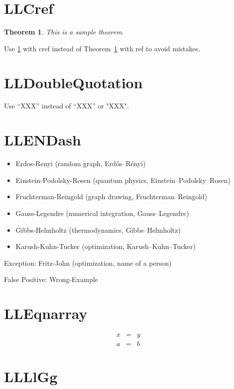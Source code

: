 \documentclass[a4paper, 10pt]{article}
\newtheorem{theorem}{Theorem}
\begin{document}
\section{LLCref}

\begin{theorem}
    \label{thm:sample}
    This is a sample theorem.
\end{theorem}

Use \cref{thm:sample} with cref instead of Theorem~\ref{thm:sample} with ref to avoid mistakes.

\section{LLDoubleQuotation}

Use ``XXX'' instead of “XXX” or "XXX".

\section{LLENDash}

\begin{itemize}
    \item Erdos-Renyi (random graph, Erd\H{o}s--R\'enyi)
    \item Einstein-Podolsky-Rosen (quantum physics, Einstein--Podolsky--Rosen)
    \item Fruchterman-Reingold (graph drawing, Fruchterman--Reingold)
    \item Gauss-Legendre (numerical integration, Gauss--Legendre)
    \item Gibbs-Helmholtz (thermodynamics, Gibbs--Helmholtz)
    \item Karush-Kuhn-Tucker (optimization, Karush--Kuhn--Tucker)
\end{itemize}

Exception: Fritz-John (optimization, name of a person)

False Positive: Wrong-Example

\section{LLEqnarray}

\begin{eqnarray}
    x & = & y \\
    a & = & b
\end{eqnarray}

\section{LLLlGg}
\end{document}
